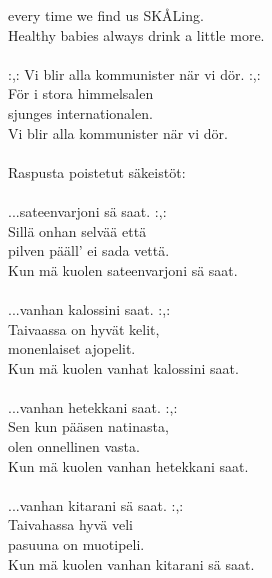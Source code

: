             every time we find us SKÅLing. \\
            Healthy babies always drink a little more. \\
\hspace{10mm} \\
            :,: Vi blir alla kommunister när vi dör. :,: \\
            För i stora himmelsalen \\
            sjunges internationalen. \\
            Vi blir alla kommunister när vi dör. \\
\hspace{10mm} \\
            Raspusta poistetut säkeistöt: \\
\hspace{10mm} \\
            ...sateenvarjoni sä saat. :,: \\
            Sillä onhan selvää että \\
            pilven pääll’ ei sada vettä. \\
            Kun mä kuolen sateenvarjoni sä saat. \\
\hspace{10mm} \\
            ...vanhan kalossini saat. :,: \\
            Taivaassa on hyvät kelit, \\
            monenlaiset ajopelit. \\
            Kun mä kuolen vanhat kalossini saat. \\
\hspace{10mm} \\
            ...vanhan hetekkani saat. :,: \\
            Sen kun pääsen natinasta, \\
            olen onnellinen vasta. \\
            Kun mä kuolen vanhan hetekkani saat. \\
\hspace{10mm} \\
            ...vanhan kitarani sä saat. :,: \\
            Taivahassa hyvä veli \\
            pasuuna on muotipeli. \\
            Kun mä kuolen vanhan kitarani sä saat. \\
\hspace{10mm} \\
